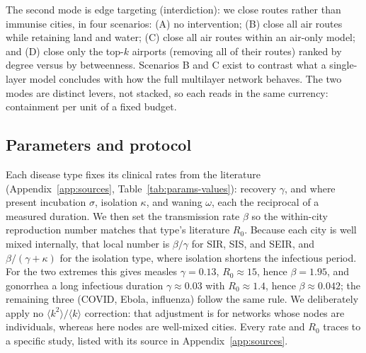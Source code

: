 The second mode is edge targeting (interdiction): we close routes rather than immunise cities, in
four scenarios: (A) no intervention; (B) close all air routes while retaining land and water; (C)
close all air routes within an air-only model; and (D) close only the top-$k$ airports (removing all
of their routes) ranked by degree versus by betweenness. Scenarios B and C exist to contrast what a single-layer model
concludes with how the full multilayer network behaves. The two modes are distinct levers, not
stacked, so each reads in the same currency: containment per unit of a fixed budget.

\subsection{Parameters and protocol} \label{sec:params}
Each disease type fixes its clinical rates from the literature (Appendix~\ref{app:sources},
Table~\ref{tab:params-values}): recovery $\gamma$, and where present incubation $\sigma$, isolation
$\kappa$, and waning $\omega$, each the reciprocal of a measured duration. We then set the
transmission rate $\beta$ so the within-city reproduction number matches that type's literature
$R_0$. Because each city is well mixed internally, that local number is $\beta/\gamma$ for SIR, SIS,
and SEIR, and $\beta/(\gamma+\kappa)$ for the isolation type, where isolation shortens the infectious
period. For the two extremes this gives measles $\gamma=0.13$, $R_0\approx15$, hence $\beta=1.95$,
and gonorrhea a long infectious duration $\gamma\approx0.03$ with $R_0\approx1.4$, hence
$\beta\approx0.042$; the remaining three (COVID, Ebola, influenza) follow the same rule. We
deliberately apply no $\langle k^2\rangle/\langle k\rangle$ correction: that adjustment is for
networks whose nodes are individuals, whereas here nodes are well-mixed cities. Every rate and $R_0$
traces to a specific study, listed with its source in Appendix~\ref{app:sources}.

